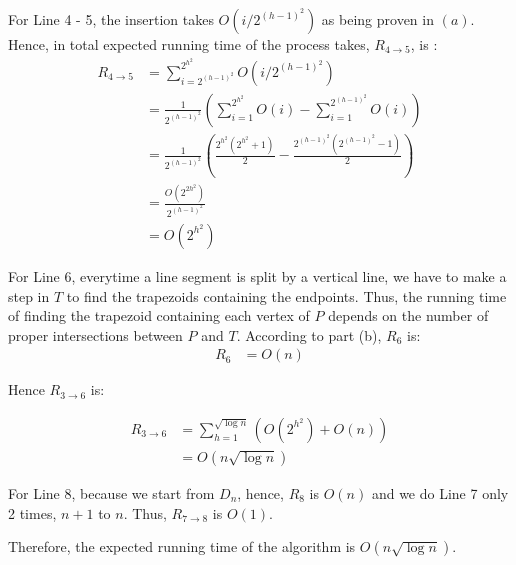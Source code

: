 For Line 4 - 5, the insertion takes $O(i/2^{(h-1)^2})$ as being proven in $(a)$. Hence, in total
expected running time of the process takes, $R_{4\rightarrow5}$, is :
\begin{align*}
R_{4\rightarrow5} &= \sum_{i=2^{(h-1)^2}}^{2^{h^2}}O(i/2^{(h-1)^2}) \\
&= \frac{1}{2^{(h-1)^2}} ( \sum_{i=1}^{2^{h^2}}O(i) - \sum_{i=1}^{2^{(h-1)^2}}O(i) ) \\
&= \frac{1}{2^{(h-1)^2}} ( \frac{2^{h^2}(2^{h^2} + 1)}{2} - \frac{2^{(h-1)^2}(2^{(h-1)^2} - 1)}{2} ) \\
&= \frac{O(2^{2h^2})}{2^{(h-1)^2}} \\
&= O(2^{h^2})
\end{align*}

For Line 6, everytime a line segment is split by a vertical line, we have to make a step in $T$ to find the trapezoids containing the endpoints. Thus, the running time of finding the trapezoid containing each vertex of $P$ depends
on the number of proper intersections between $P$ and $T$. According to part (b), $R_{6}$ is:
\begin{align*}
    R_6 &= O(n)
\end{align*}

Hence $R_{3\rightarrow6}$ is:

\begin{align*}
    R_{3\rightarrow6} &= \sum_{h=1}^{\sqrt{\log{n}}}( O(2^{h^2}) + O(n) ) \\
    &= O(n\sqrt{\log{n}})
\end{align*}

For Line 8, because we start from $D_{n}$, hence, $R_{8}$ is $O(n)$ and we do Line 7 only
2 times, $n+1$ to $n$. Thus, $R_{7\rightarrow8}$ is $O(1)$.

Therefore, the expected running time of the algorithm is $O(n\sqrt{\log{n}})$.
